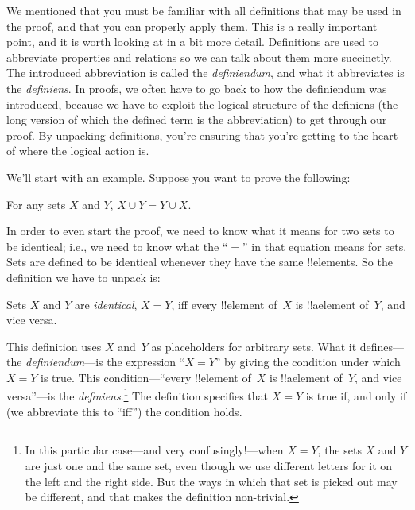 \documentclass[../../../include/open-logic-section]{subfiles}
\begin{document}


We mentioned that you must be familiar with all definitions that may
be used in the proof, and that you can properly apply them. This is a
really important point, and it is worth looking at in a bit more
detail. Definitions are used to abbreviate properties and relations so
we can talk about them more succinctly. The introduced abbreviation is
called the \emph{definiendum}, and what it abbreviates is the
\emph{definiens}.  In proofs, we often have to go back to how the
definiendum was introduced, because we have to exploit the logical
structure of the definiens (the long version of which the defined term
is the abbreviation) to get through our proof.  By unpacking
definitions, you're ensuring that you're getting to the heart of where
the logical action is.

We'll start with an example. Suppose you want to prove the following:

\begin{prop}
For any sets $X$ and $Y$, $X \cup Y = Y \cup X$.
\end{prop}

In order to even start the proof, we need to know what it means for
two sets to be identical; i.e., we need to know what the ``$=$'' in
that equation means for sets.  Sets are defined to be identical
whenever they have the same !!{element}s.  So the definition we have
to unpack is:

\begin{defn}
Sets $X$ and $Y$ are \emph{identical}, $X = Y$, iff every !!{element}
of~$X$ is !!a{element} of~$Y$, and vice versa.
\end{defn}

This definition uses $X$ and~$Y$ as placeholders for arbitrary
sets. What it defines---the \emph{definiendum}---is the expression
``$X = Y$'' by giving the condition under which $X = Y$ is true.  This
condition---``every !!{element} of~$X$ is !!a{element} of~$Y$, and
vice versa''---is the \emph{definiens}.\footnote{In this particular
  case---and very confusingly!---when $X = Y$, the sets $X$ and $Y$
  are just one and the same set, even though we use different letters
  for it on the left and the right side.  But the ways in which that
  set is picked out may be different, and that makes the definition
  non-trivial.} The definition specifies that $X = Y$ is true if, and
only if (we abbreviate this to ``iff'') the condition holds.
\end{document}
